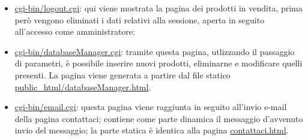 {\begin{itemize}
		\item \href{http://tecnologie-web.studenti.math.unipd.it/tecweb/~pgabelli/cgi-bin/logout.cgi}{cgi-bin/logout.cgi}: qui viene mostrata la pagina dei prodotti in vendita, prima però vengono eliminati i dati relativi alla sessione, aperta in seguito all'accesso come amministratore;
		\item \href{http://tecnologie-web.studenti.math.unipd.it/tecweb/~pgabelli/cgi-bin/databaseManager.cgi}{cgi-bin/databaseManager.cgi}: tramite questa pagina, utlizzando il passaggio di parametri, è possibile inserire nuovi prodotti, eliminarne e modificare quelli presenti. La pagina viene generata a partire dal file statico \href{http://tecnologie-web.studenti.math.unipd.it/tecweb/~pgabelli/databaseManager.html}{public\_html/databaseManager.html}.
		\item \href{http://tecnologie-web.studenti.math.unipd.it/tecweb/~pgabelli/cgi-bin/email.cgi}{cgi-bin/email.cgi}: questa pagina viene raggiunta in seguito all'invio e-mail della pagina contattaci; contiene come parte dinamica il messaggio d'avvenuto invio del messaggio; la parte statica è identica alla pagina \href{http://tecnologie-web.studenti.math.unipd.it/tecweb/~pgabelli/contattaci.html}{contattaci.html}.
	\end{itemize}
}